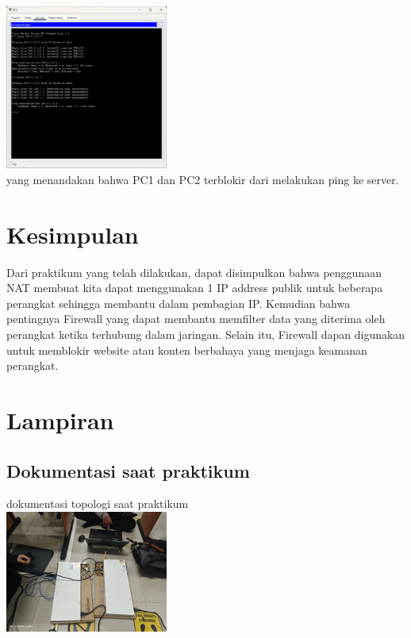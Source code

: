 \includegraphics[width=0.4\textwidth]{p4/img/tumod6.png}\\
yang menandakan bahwa PC1 dan PC2 terblokir dari melakukan ping ke server.
\section{Kesimpulan}
Dari praktikum yang telah dilakukan, dapat disimpulkan bahwa penggunaan NAT membuat kita dapat menggunakan 1 IP address publik untuk beberapa perangkat sehingga membantu dalam pembagian IP. Kemudian bahwa pentingnya Firewall yang dapat membantu memfilter data yang diterima oleh perangkat ketika terhubung dalam jaringan. Selain itu, Firewall dapan digunakan untuk memblokir website atau konten berbahaya yang menjaga keamanan perangkat.

\section{Lampiran}
\subsection{Dokumentasi saat praktikum}
dokumentasi topologi saat praktikum\\
\includegraphics[width=0.4\textwidth]{p4/img/topologi_praktikum.jpg}

